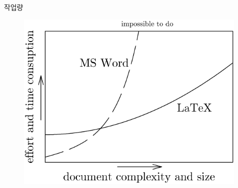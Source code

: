 \documentclass[12pt]{beamer}
\begin{document}
\begin{frame}{작업량}
	\begin{figure}[h]
		\centering
		\includegraphics[width=\textwidth]{msword_vs_latex.png}
	\end{figure}
\end{frame}
\end{document}
